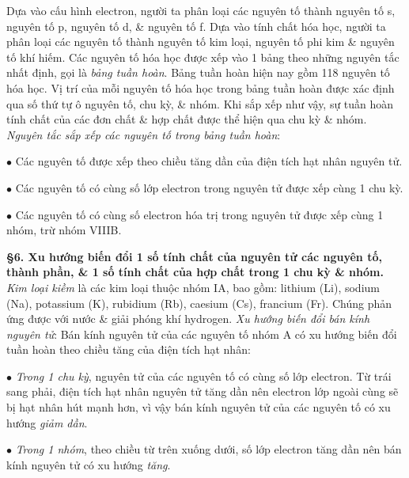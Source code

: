 \documentclass{article}
\numberwithin{equation}{section}
\begin{document}
Dựa vào cấu hình electron, người ta phân loại các nguyên tố thành nguyên tố s, nguyên tố p, nguyên tố d, \& nguyên tố f. Dựa vào tính chất hóa học, người ta phân loại các nguyên tố thành nguyên tố kim loại, nguyên tố phi kim \& nguyên tố khí hiếm. Các nguyên tố hóa học được xếp vào 1 bảng theo những nguyên tắc nhất định, gọi là \textit{bảng tuần hoàn}. Bảng tuần hoàn hiện nay gồm 118 nguyên tố hóa học. Vị trí của mỗi nguyên tố hóa học trong bảng tuần hoàn được xác định qua số thứ tự ô nguyên tố, chu kỳ, \& nhóm. Khi sắp xếp như vậy, sự tuần hoàn tính chất của các đơn chất \& hợp chất được thể hiện qua chu kỳ \& nhóm. \textit{Nguyên tắc sắp xếp các nguyên tố trong bảng tuần hoàn}:
\begin{enumerate*}
	\item[$\bullet$] Các nguyên tố được xếp theo chiều tăng dần của điện tích hạt nhân nguyên tử.
	\item[$\bullet$] Các nguyên tố có cùng số lớp electron trong nguyên tử được xếp cùng 1 chu kỳ.
	\item[$\bullet$] Các nguyên tố có cùng số electron hóa trị trong nguyên tử được xếp cùng 1 nhóm, trừ nhóm VIIIB.
\end{enumerate*}
\textbf{\S6. Xu hướng biến đổi 1 số tính chất của nguyên tử các nguyên tố, thành phần, \& 1 số tính chất của hợp chất trong 1 chu kỳ \& nhóm.} \textit{Kim loại kiềm} là các kim loại thuộc nhóm IA, bao gồm: lithium (Li), sodium (Na), potassium (K), rubidium (Rb), caesium (Cs), francium (Fr). Chúng phản ứng được với nước \& giải phóng khí hydrogen. \textit{Xu hướng biến đổi bán kính nguyên tử}: Bán kính nguyên tử của các nguyên tố nhóm A có xu hướng biến đổi tuần hoàn theo chiều tăng của điện tích hạt nhân:
\begin{enumerate*}
	\item[$\bullet$] \textit{Trong 1 chu kỳ}, nguyên tử của các nguyên tố có cùng số lớp electron. Từ trái sang phải, điện tích hạt nhân nguyên tử tăng dần nên electron lớp ngoài cùng sẽ bị hạt nhân hút mạnh hơn, vì vậy bán kính nguyên tử của các nguyên tố có xu hướng \textit{giảm dần}.
	\item[$\bullet$] \textit{Trong 1 nhóm}, theo chiều từ trên xuống dưới, số lớp electron tăng dần nên bán kính nguyên tử có xu hướng \textit{tăng}.
\end{enumerate*}
\end{document}
